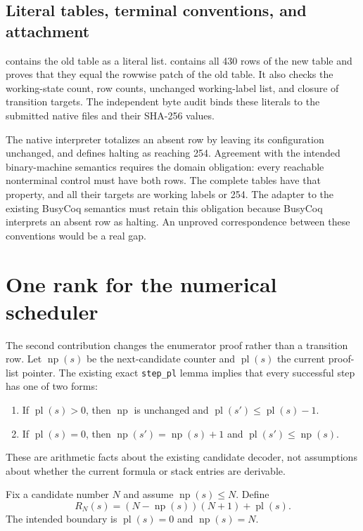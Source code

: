 \documentclass[11pt]{article}
\newcommand{\np}{\operatorname{np}}
\newcommand{\pl}{\operatorname{pl}}
\newcommand{\code}[1]{\texttt{#1}}
\begin{document}
\subsection{Literal tables, terminal conventions, and attachment}

 contains the old table as a literal list.  contains all 430 rows of the new table and proves that they equal the rowwise patch of the old table. It also checks the working-state count, row counts, unchanged working-label list, and closure of transition targets. The independent byte audit binds these literals to the submitted native files and their SHA-256 values.

The native interpreter totalizes an absent row by leaving its configuration unchanged, and defines halting as reaching 254. Agreement with the intended binary-machine semantics requires the domain obligation: every reachable nonterminal control must have both rows. The complete tables have that property, and all their targets are working labels or 254. The adapter to the existing BusyCoq semantics must retain this obligation because BusyCoq interprets an absent row as halting. An unproved correspondence between these conventions would be a real gap.



\section{One rank for the numerical scheduler}
\label{sec:rank}

The second contribution changes the enumerator proof rather than a transition row. Let $\np(s)$ be the next-candidate counter and $\pl(s)$ the current proof-list pointer. The existing exact \code{step\_pl} lemma implies that every successful step has one of two forms:
\begin{enumerate}
\item If $\pl(s)>0$, then $\np$ is unchanged and $\pl(s')\le\pl(s)-1$.
\item If $\pl(s)=0$, then $\np(s')=\np(s)+1$ and $\pl(s')\le\np(s)$.
\end{enumerate}
These are arithmetic facts about the existing candidate decoder, not assumptions about whether the current formula or stack entries are derivable.

Fix a candidate number $N$ and assume $\np(s)\le N$. Define
\[
 \boxed{\quad R_N(s)=(N-\np(s))(N+1)+\pl(s).\quad}
\]
The intended boundary is $\pl(s)=0$ and $\np(s)=N$.
\end{document}
